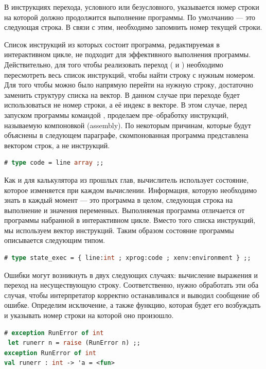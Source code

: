 В инструкциях перехода, условного или безусловного, указывается номер строки на 
которой должно продолжится выполнение программы. По умолчанию --- это следующая 
строка. В связи с этим, необходимо запомнить номер текущей строки.

Список инструкций из которых состоит программа, редактируемая в интерактивном 
цикле, не подходит для эффективного выполнения программы. Действительно, для 
того чтобы реализовать переход ( и ) необходимо 
пересмотреть весь список инструкций, чтобы найти строку с нужным номером. Для 
того чтобы можно было напрямую перейти на нужную строку, достаточно заменить 
структуру списка на вектор. В данном случае при переходе будет использоваться не 
номер строки, а её индекс в векторе. В этом случае, перед запуском программы 
командой , проделаем пре--обработку инструкций, называемую 
компоновкой (assembly). По некоторым причинам, которые будут объяснены в 
следующем параграфе, скомпонованная программа представлена вектором строк, а не 
инструкций.

\begin{lstlisting}[language=OCaml]
# type code = line array ;;
\end{lstlisting}

Как и для калькулятора из прошлых глав, вычислитель использует состояние, 
которое изменяется при каждом вычислении. Информация, которую необходимо знать в 
каждый момент --- это программа в целом, следующая строка на выполнение и 
значения переменных. Выполняемая программа отличается от программы набранной в 
интерактивном цикле. Вместо того списка инструкций, мы используем вектор 
инструкций. Таким образом состояние программы описывается следующим типом.

\begin{lstlisting}[language=OCaml]
# type state_exec = { line:int ; xprog:code ; xenv:environment } ;;
\end{lstlisting}

Ошибки могут возникнуть в двух следующих случаях: вычисление выражения и переход 
на несуществующую строку. Соответственно, нужно обработать эти оба случая, чтобы 
интерпретатор корректно останавливался и выводил сообщение об ошибке. Определим 
исключение, а также функцию, которая будет его возбуждать и указывать номер 
строки на которой оно произошло.

\begin{lstlisting}[language=OCaml]
# exception RunError of int 
 let runerr n = raise (RunError n) ;;
exception RunError of int
val runerr : int -> 'a = <fun>
\end{lstlisting}

